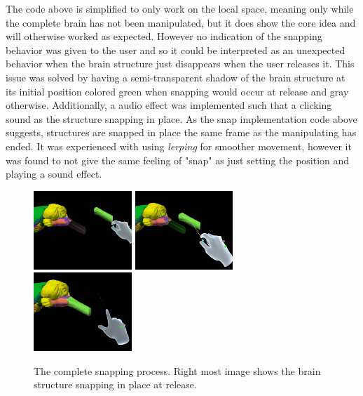 The code above is simplified to only work on the local space, meaning only while the complete brain has not been manipulated, but it does show the core idea and will otherwise worked as expected. However no indication of the snapping behavior was given to the user and so it could be interpreted as an unexpected behavior when the brain structure just disappears when the user releases it. This issue was solved by having a semi-transparent shadow of the brain structure at its initial position colored green when snapping would occur at release and gray otherwise. Additionally, a audio effect was implemented such that a clicking sound as the structure snapping in place. 
As the snap implementation code above suggests, structures are snapped in place the same frame as the manipulating has ended. It was experienced with using \textit{lerping} for smoother movement, however it was found to not give the same feeling of "snap" as just setting the position and playing a sound effect.

\begin{figure}
    \includegraphics[width=0.33\textwidth]{fig/snaphint1.png}
    \includegraphics[width=0.33\textwidth]{fig/snaphint2.png}
    \includegraphics[width=0.33\textwidth]{fig/snaphint3.png}
    \caption{The complete snapping process. Right most image shows the brain structure snapping in place at release.}
\end{figure}

